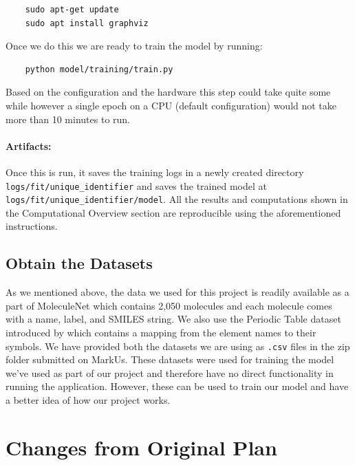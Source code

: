 \documentclass[fontsize=11pt]{article}
\begin{document}
\begin{verbatim}
    sudo apt-get update
    sudo apt install graphviz
\end{verbatim}

Once we do this we are ready to train the model by running:

\begin{verbatim}
    python model/training/train.py
\end{verbatim}

Based on the configuration and the hardware this step could take quite some while however a single epoch on a CPU (default configuration) would not take more than 10 minutes to run.

\paragraph{Artifacts:} Once this is run, it saves the training logs in a newly created directory \texttt{logs/fit/unique\_identifier} and saves the trained model at \texttt{logs/fit/unique\_identifier/model}. All the results and computations shown in the Computational Overview section are reproducible using the aforementioned instructions.

\subsection*{Obtain the Datasets}

As we mentioned above, the data we used for this project is readily available as a part of MoleculeNet \citep{wu2018moleculenet} which contains 2,050 molecules and each molecule comes with a name, label, and SMILES string. We also use the Periodic Table dataset introduced by \cite{periodicdataset} which contains a mapping from the element names to their symbols. We have provided both the datasets we are using as \texttt{.csv} files in the zip folder submitted on MarkUs. These datasets were used for training the model we've used as part of our project and therefore have no direct functionality in running the application. However, these can be used to train our model and have a better idea of how our project works.

\section*{Changes from Original Plan}
\end{document}
